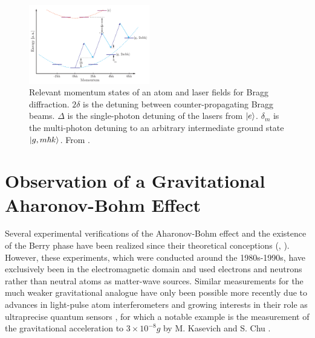 \documentclass[reprint,
nofootinbib,
amsmath,amssymb,
aps]{revtex4-1}
\begin{document}
\begin{figure}
	\includegraphics[width=0.47\textwidth]{Bragg.png}
	\caption{Relevant momentum states of an atom and laser fields for Bragg diffraction. $2\delta$ is the detuning between counter-propagating Bragg beams. $\Delta$ is the single-photon detuning of the lasers from $\ket{e}$. $\delta_m$ is the multi-photon detuning to an arbitrary intermediate ground state $\ket{g,m\hbar k}$. From \cite{estey2016precision}.}
	\label{fig:Bragg}
\end{figure}



\section{Observation of a Gravitational Aharonov-Bohm Effect}\label{sect:grav}
Several experimental verifications of the Aharonov-Bohm effect and the existence of the Berry phase have been realized since their theoretical conceptions (\cite{tonomura1986evidence}, \cite{cimmino1989observation}). However, these experiments, which were conducted around the 1980s-1990s, have exclusively been in the electromagnetic domain and used electrons and neutrons rather than neutral atoms as matter-wave sources. Similar measurements for the much weaker gravitational analogue have only been possible more recently due to advances in light-pulse atom interferometers and growing interests in their role as ultraprecise quantum sensors \cite{bongs2019taking}, for which a notable example is the measurement of the gravitational acceleration to $3\times 10^{-8} g$ by M. Kasevich and S. Chu \cite{kasevich1992measurement}. 
\end{document}
